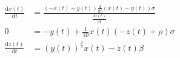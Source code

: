 \begin{align}
\frac{\mathrm{d} x\left( t \right)}{\mathrm{d}t} &= \frac{\left(  - x\left( t \right) + y\left( t \right) \right) \frac{\mathrm{d}}{\mathrm{d}t} \left( x\left( t \right) - y\left( t \right) \right) \sigma}{\frac{\mathrm{d} z\left( t \right)}{\mathrm{d}t}} \\
0 &=  - y\left( t \right) + \frac{1}{10} x\left( t \right) \left(  - z\left( t \right) + \rho \right) \sigma \\
\frac{\mathrm{d} z\left( t \right)}{\mathrm{d}t} &= \left( y\left( t \right) \right)^{\frac{2}{3}} x\left( t \right) - z\left( t \right) \beta
\end{align}
